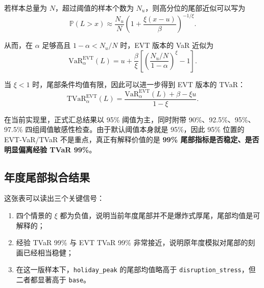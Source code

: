 若样本总量为 $N$，超过阈值的样本个数为 $N_u$，则高分位的尾部近似可以写为
\begin{equation}
\mathbb{P}(L > x)
\approx
\frac{N_u}{N}
\left(
1 + \frac{\xi(x-u)}{\beta}
\right)^{-1/\xi}.
\end{equation}

从而，在 $\alpha$ 足够高且 $1-\alpha < N_u/N$ 时，EVT 版本的 VaR 近似为
\begin{equation}
\mathrm{VaR}^{\mathrm{EVT}}_{\alpha}(L)
=
u + \frac{\beta}{\xi}
\left[
\left(
\frac{N_u/N}{1-\alpha}
\right)^{\xi} - 1
\right].
\end{equation}

当 $\xi < 1$ 时，尾部条件均值有限，因此可以进一步得到 EVT 版本的 TVaR：
\begin{equation}
\mathrm{TVaR}^{\mathrm{EVT}}_{\alpha}(L)
=
\frac{
\mathrm{VaR}^{\mathrm{EVT}}_{\alpha}(L) + \beta - \xi u
}{1-\xi}.
\end{equation}

在当前实现里，正式汇总结果以 95\% 阈值为主，同时附带 90\%、92.5\%、95\%、97.5\% 四组阈值敏感性检查。由于默认阈值本身就是 95\%，因此 95\% 位置的 EVT-VaR/TVaR 不是重点，真正有解释价值的是 \textbf{99\% 尾部指标是否稳定、是否明显偏离经验 TVaR 99\%}。

\subsection{年度尾部拟合结果}

\begin{table}[H]
\centering
\caption{年度情景的 GPD 尾部拟合与 EVT TVaR 99\%}
\end{table}

这张表可以读出三个关键信号：
\begin{enumerate}[leftmargin=2.2em]
  \item 四个情景的 $\xi$ 都为负值，说明当前年度尾部并不是爆炸式厚尾，尾部均值是可解释的；
  \item 经验 TVaR 99\% 与 EVT TVaR 99\% 非常接近，说明原年度模拟对尾部的刻画已经相当稳健；
  \item 在这一版样本下，\texttt{holiday\_peak} 的尾部均值略高于 \texttt{disruption\_stress}，但二者都显著高于 \texttt{base}。
\end{enumerate}

